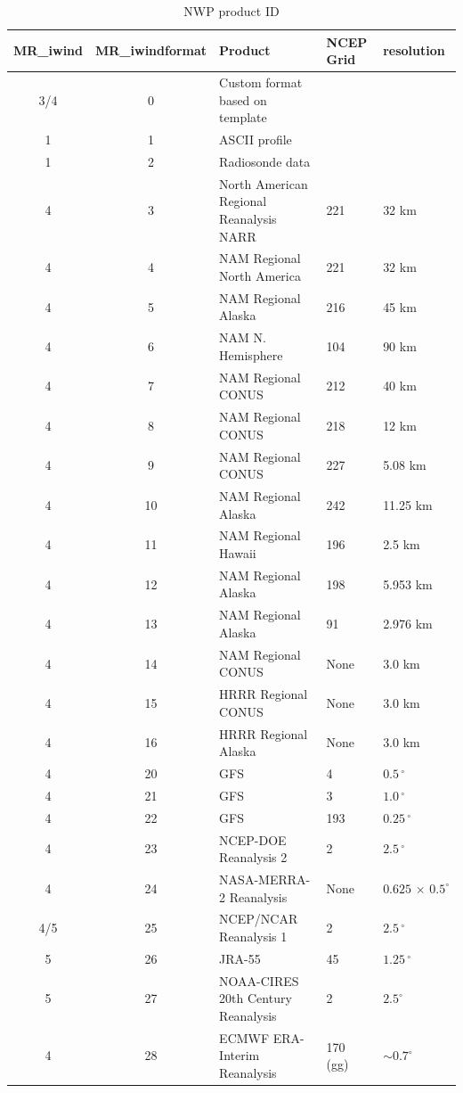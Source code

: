 \documentclass[11pt]{article}   %
\begin{document}
\begin{table}[h]\label{Tabiwf}
\caption{NWP product ID}
\footnotesize
\begin{tabular}{| c | c | l | l | l |}
\hline
MR\_iwind & MR\_iwindformat & Product & NCEP Grid & resolution \\
\hline
3/4 &  0 & Custom format based on template & & \\
1 &  1 & ASCII profile & & \\
1 &  2 & Radiosonde data & & \\
\hline
4 &   3 & North American Regional Reanalysis NARR & 221 & 32 km \\
4 &   4 & NAM Regional North America & 221 & 32 km \\
4 &   5 & NAM Regional Alaska & 216 & 45 km \\
4 &   6 & NAM N. Hemisphere & 104 & 90 km \\
4 &   7 & NAM Regional CONUS & 212 & 40 km \\
4 &   8 & NAM Regional CONUS & 218 & 12 km \\
4 &   9 & NAM Regional CONUS & 227 & 5.08 km \\
4 &  10 & NAM Regional Alaska & 242 & 11.25 km \\
4 &  11 & NAM Regional Hawaii & 196 & 2.5 km \\
4 &  12 & NAM Regional Alaska & 198 & 5.953 km \\
4 &  13 & NAM Regional Alaska & 91 & 2.976 km \\
4 &  14 & NAM Regional CONUS & None & 3.0 km \\
4 &  15 & HRRR Regional CONUS & None & 3.0 km \\
4 &  16 & HRRR Regional Alaska & None & 3.0 km \\
  \hline
4 &  20 & GFS & 4   & $ 0.5 \, ^{\circ}$ \\
4 &  21 & GFS & 3   & $ 1.0 \, ^{\circ}$ \\
4 &  22 & GFS & 193 & $0.25 \, ^{\circ}$ \\
4 &  23 & NCEP-DOE Reanalysis 2 & 2  & $2.5 \, ^{\circ}$ \\
4 &  24 & NASA-MERRA-2 Reanalysis & None & $0.625 \, \times \,0.5^{\circ}$ \\
4/5 &  25 & NCEP/NCAR Reanalysis 1 & 2 & $2.5 \, ^{\circ}$ \\
5 &  26 & JRA-55 & 45 & $1.25 \, ^{\circ}$ \\
5 &  27 & NOAA-CIRES 20th Century Reanalysis & 2 & $2.5^{\circ}$ \\
4 &  28 & ECMWF ERA-Interim Reanalysis & 170 (gg) & $\sim 0.7^{\circ}$ \\

\end{tabular}
\end{table}
\end{document}
